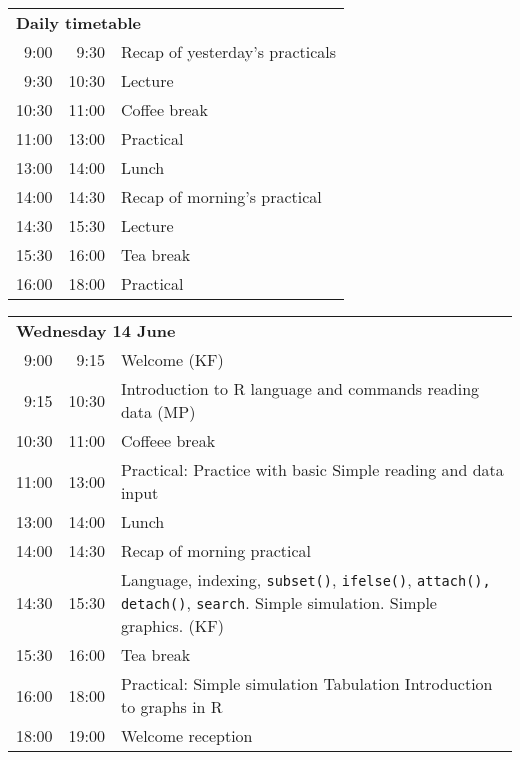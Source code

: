 \noindent
\begin{tabular}{r@{ -- }rp{13cm}}
\multicolumn{3}{l}{\bf Daily timetable} \\
 9:00 &  9:30 & Recap of yesterday's practicals \\
 9:30 & 10:30 & Lecture \\
10:30 & 11:00 & Coffee break \\
11:00 & 13:00 & Practical \\
13:00 & 14:00 & Lunch \\
14:00 & 14:30 & Recap of morning's practical \\
14:30 & 15:30 & Lecture \\
15:30 & 16:00 & Tea break \\
16:00 & 18:00 & Practical \\[2em]
\end{tabular}

\noindent
\begin{tabular}{r@{ -- }rp{12cm}}
\multicolumn{3}{l}{\bf Wednesday 14 June} \\
 9:00 &  9:15 & Welcome (KF) \\
 9:15 & 10:30 & Introduction to R language and commands reading data (MP) \\
10:30 & 11:00 & Coffeee break \\
11:00 & 13:00 & Practical:
                Practice with basic \R \newline
                Simple reading and data input \\
13:00 & 14:00 & Lunch \\
14:00 & 14:30 & Recap of morning practical \\
14:30 & 15:30 & Language, indexing,
                {\tt subset()}, {\tt ifelse()},
                \texttt{attach(), detach()},
                \texttt{search}. Simple simulation. Simple graphics. (KF)\\
15:30 & 16:00 & Tea break\\
16:00 & 18:00 & Practical: Simple simulation \newline
                Tabulation\newline
                Introduction to graphs in R \\
18:00 & 19:00 & Welcome reception
\end{tabular}

